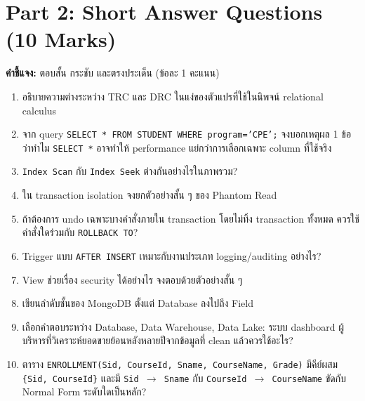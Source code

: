 \documentclass[a4paper,12pt]{article}
\begin{document}
\newpage
\section*{Part 2: Short Answer Questions (10 Marks)}
\textbf{คำชี้แจง:} ตอบสั้น กระชับ และตรงประเด็น (ข้อละ 1 คะแนน)

\begin{enumerate}[label=\textbf{\arabic*.}]
    \item อธิบายความต่างระหว่าง TRC และ DRC ในแง่ของตัวแปรที่ใช้ในนิพจน์ relational calculus
    \vspace{1.3cm}

    \item จาก query \texttt{SELECT * FROM STUDENT WHERE program='CPE';} จงบอกเหตุผล 1 ข้อว่าทำไม \texttt{SELECT *} อาจทำให้ performance แย่กว่าการเลือกเฉพาะ column ที่ใช้จริง
    \vspace{1.3cm}

    \item \texttt{Index Scan} กับ \texttt{Index Seek} ต่างกันอย่างไรในภาพรวม?
    \vspace{1.3cm}

    \item ใน transaction isolation จงยกตัวอย่างสั้น ๆ ของ Phantom Read
    \vspace{1.3cm}

    \item ถ้าต้องการ undo เฉพาะบางคำสั่งภายใน transaction โดยไม่ทิ้ง transaction ทั้งหมด ควรใช้คำสั่งใดร่วมกับ \texttt{ROLLBACK TO}?
    \vspace{1.3cm}

    \item Trigger แบบ \texttt{AFTER INSERT} เหมาะกับงานประเภท logging/auditing อย่างไร?
    \vspace{1.3cm}

    \item View ช่วยเรื่อง security ได้อย่างไร จงตอบด้วยตัวอย่างสั้น ๆ
    \vspace{1.3cm}

    \item เขียนลำดับชั้นของ MongoDB ตั้งแต่ Database ลงไปถึง Field
    \vspace{1.3cm}

    \item เลือกคำตอบระหว่าง Database, Data Warehouse, Data Lake: ระบบ dashboard ผู้บริหารที่วิเคราะห์ยอดขายย้อนหลังหลายปีจากข้อมูลที่ clean แล้วควรใช้อะไร?
    \vspace{1.3cm}

    \item ตาราง \texttt{ENROLLMENT(Sid, CourseId, Sname, CourseName, Grade)} มีคีย์ผสม \texttt{\{Sid, CourseId\}} และมี \texttt{Sid $\rightarrow$ Sname} กับ \texttt{CourseId $\rightarrow$ CourseName} ขัดกับ Normal Form ระดับใดเป็นหลัก?
    \vspace{1.3cm}
\end{enumerate}
\end{document}

